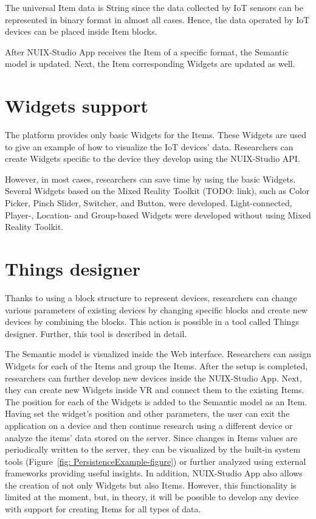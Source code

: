 The universal Item data is String since the data collected by IoT sensors can be represented in binary format in almost all cases. Hence, the data operated by IoT devices can be placed inside Item blocks.

After NUIX-Studio App receives the Item of a specific format, the Semantic model is updated. Next, the Item corresponding Widgets are updated as well.

\section{Widgets support}

The platform provides only basic Widgets for the Items. These Widgets are used to give an example of how to visualize the IoT devices' data. Researchers can create Widgets specific to the device they develop using the NUIX-Studio API.

However, in most cases, researchers can save time by using the basic Widgets. Several Widgets based on the Mixed Reality Toolkit (TODO: link), such as Color Picker, Pinch Slider, Switcher, and Button, were developed. Light-connected, Player-, Location- and Group-based Widgets were developed without using Mixed Reality Toolkit.

\section{Things designer}

Thanks to using a block structure to represent devices, researchers can change various parameters of existing devices by changing specific blocks and create new devices by combining the blocks. This action is possible in a tool called Things designer. Further, this tool is described in detail.

The Semantic model is visualized inside the Web interface. Researchers can assign Widgets for each of the Items and group the Items. After the setup is completed, researchers can further develop new devices inside the NUIX-Studio App. Next, they can create new Widgets inside VR and connect them to the existing Items. The position for each of the Widgets is added to the Semantic model as an Item. Having set the widget's position and other parameters, the user can exit the application on a device and then continue research using a different device or analyze the items' data stored on the server. Since changes in Items values ​​are periodically written to the server, they can be visualized by the built-in system tools (Figure~\ref{fig: PersistenceExample-figure}) or further analyzed using external frameworks providing useful insights. In addition, NUIX-Studio App also allows the creation of not only Widgets but also Items. However, this functionality is limited at the moment, but, in theory, it will be possible to develop any device with support for creating Items for all types of data.

